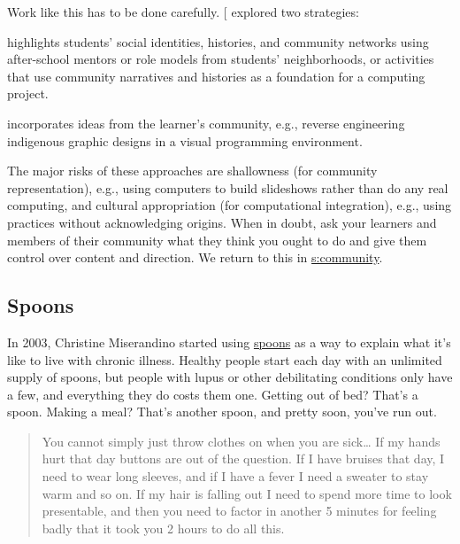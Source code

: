 Work like this has to be done carefully. {[}\protect[\hyperlink{b:Lach2018}{Lach2018}]{]} explored two
strategies:

\begin{description}
\tightlist
\item[{\protect\hyperlink{g:community-representation}{Community representation}}]
highlights students' social identities, histories, and community
networks using after-school mentors or role models from students'
neighborhoods, or activities that use community narratives and
histories as a foundation for a computing project.
\item[{\protect\hyperlink{g:computational-integration}{Computational integration}}]
incorporates ideas from the learner's community, e.g., reverse
engineering indigenous graphic designs in a visual programming
environment.
\end{description}

The major risks of these approaches are shallowness (for community
representation), e.g., using computers to build slideshows rather than
do any real computing, and cultural appropriation (for computational
integration), e.g., using practices without acknowledging origins. When
in doubt, ask your learners and members of their community what they
think you ought to do and give them control over content and direction.
We return to this in \protect\hyperlink{CHAPTER}{s:community}.

\subsection{Spoons}\label{spoons}

In 2003, Christine Miserandino started using
\href{https://butyoudontlooksick.com/articles/written-by-christine/the-spoon-theory/}{spoons} as a way to explain what it's like to
live with chronic illness. Healthy people start each day with an
unlimited supply of spoons, but people with lupus or other
debilitating conditions only have a few, and everything they do costs
them one. Getting out of bed? That's a spoon. Making a meal? That's
another spoon, and pretty soon, you've run out.

\begin{quote}\setlength{\parindent}{0pt}
You cannot simply just throw clothes on when you are
sick\ldots{} If my hands hurt that day buttons are out of the
question. If I have bruises that day, I need to wear long sleeves, and
if I have a fever I need a sweater to stay warm and so on. If my hair
is falling out I need to spend more time to look presentable, and then
you need to factor in another 5 minutes for feeling badly that it took
you 2 hours to do all this.
\end{quote}

